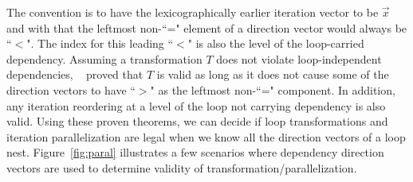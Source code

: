 The convention is to have the lexicographically earlier iteration vector to be
$\vec{x}$ and with that the leftmost non-``=" element of a direction vector would always be ``$<$". 
The index for this leading ``$<$" is also the level of the  loop-carried dependency. 
Assuming a transformation $T$ does not violate loop-independent dependencies,
~\cite{Kennedy:2001:OCM:502981} proved that $T$ is valid as long as
it does not cause some of the direction vectors to have ``$>$" as the leftmost non-``=" component. In addition, any iteration reordering at a level of the loop not carrying dependency is also valid. Using these proven theorems, we can
decide if loop transformations and iteration parallelization are legal when we know all the direction vectors of a loop nest. Figure~\ref{fig:paral} illustrates a
few scenarios where dependency direction vectors are used to determine validity
of transformation/parallelization.

